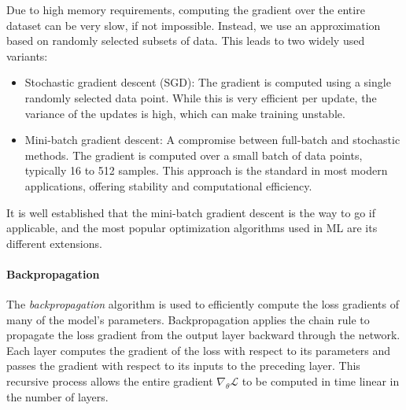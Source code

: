 Due to high memory requirements, computing the gradient over the entire dataset can be very slow, if not impossible. Instead, we use an approximation based on randomly selected subsets of data. This leads to two widely used variants:
\begin{itemize}
    \item Stochastic gradient descent (SGD): The gradient is computed using a single randomly selected data point. While this is very efficient per update, the variance of the updates is high, which can make training unstable.
    \item Mini-batch gradient descent: A compromise between full-batch and stochastic methods. The gradient is computed over a small batch of data points, typically 16 to 512 samples. This approach is the standard in most modern applications, offering stability and computational efficiency.
\end{itemize}
It is well established that the mini-batch gradient descent is the way to go if applicable, and the most popular optimization algorithms used in ML are its different extensions.

\paragraph{Backpropagation}
The \emph{backpropagation} algorithm is used to efficiently compute the loss gradients of many of the model's parameters. Backpropagation \cite{bengio2017deep} applies the chain rule to propagate the loss gradient from the output layer backward through the network. Each layer computes the gradient of the loss with respect to its parameters and passes the gradient with respect to its inputs to the preceding layer. This recursive process allows the entire gradient $\nabla_\theta \mathcal{L}$ to be computed in time linear in the number of layers.

